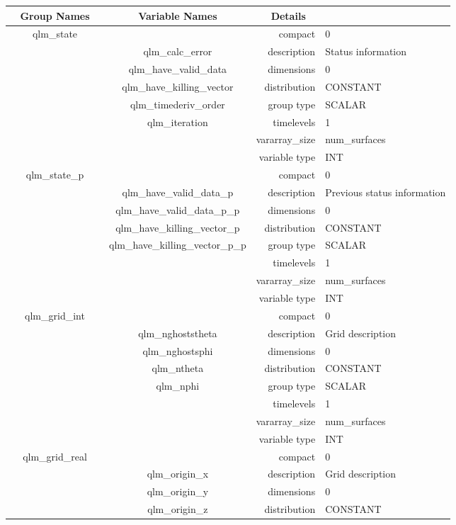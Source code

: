 \begin{tabular*}{150mm}{|c|c@{\extracolsep{\fill}}|rl|} \hline 
~ {\bf Group Names} ~ & ~ {\bf Variable Names} ~  &{\bf Details} ~ & ~\\ 
\hline 
qlm\_state &  & compact & 0 \\ 
 & qlm\_calc\_error & description & Status information \\ 
 & qlm\_have\_valid\_data & dimensions & 0 \\ 
 & qlm\_have\_killing\_vector & distribution & CONSTANT \\ 
 & qlm\_timederiv\_order & group type & SCALAR \\ 
 & qlm\_iteration & timelevels & 1 \\ 
 &  & vararray\_size & num\_surfaces \\ 
 &  & variable type & INT \\ 
\hline 
qlm\_state\_p &  & compact & 0 \\ 
 & qlm\_have\_valid\_data\_p & description & Previous status information \\ 
 & qlm\_have\_valid\_data\_p\_p & dimensions & 0 \\ 
 & qlm\_have\_killing\_vector\_p & distribution & CONSTANT \\ 
 & qlm\_have\_killing\_vector\_p\_p & group type & SCALAR \\ 
 &  & timelevels & 1 \\ 
 &  & vararray\_size & num\_surfaces \\ 
 &  & variable type & INT \\ 
\hline 
qlm\_grid\_int &  & compact & 0 \\ 
 & qlm\_nghoststheta & description & Grid description \\ 
 & qlm\_nghostsphi & dimensions & 0 \\ 
 & qlm\_ntheta & distribution & CONSTANT \\ 
 & qlm\_nphi & group type & SCALAR \\ 
 &  & timelevels & 1 \\ 
 &  & vararray\_size & num\_surfaces \\ 
 &  & variable type & INT \\ 
\hline 
qlm\_grid\_real &  & compact & 0 \\ 
 & qlm\_origin\_x & description & Grid description \\ 
 & qlm\_origin\_y & dimensions & 0 \\ 
 & qlm\_origin\_z & distribution & CONSTANT \\ 

\end{tabular*}
